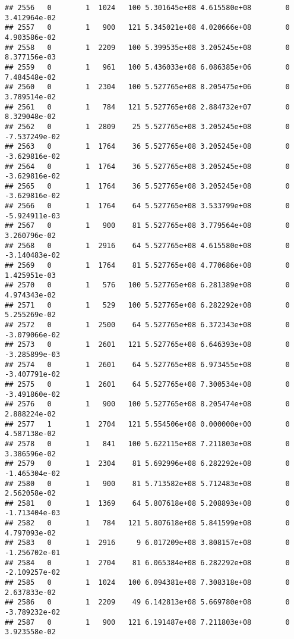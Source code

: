 \documentclass[
]{article}
\begin{document}
\begin{enumerate}
\begin{verbatim}
## 2556   0        1  1024   100 5.301645e+08 4.615580e+08        0  3.412964e-02
## 2557   0        1   900   121 5.345021e+08 4.020666e+08        0  4.903586e-02
## 2558   0        1  2209   100 5.399535e+08 3.205245e+08        0  8.377156e-03
## 2559   0        1   961   100 5.436033e+08 6.086385e+06        0  7.484548e-02
## 2560   0        1  2304   100 5.527765e+08 8.205475e+06        0  3.789514e-02
## 2561   0        1   784   121 5.527765e+08 2.884732e+07        0  8.329048e-02
## 2562   0        1  2809    25 5.527765e+08 3.205245e+08        0 -7.537249e-02
## 2563   0        1  1764    36 5.527765e+08 3.205245e+08        0 -3.629816e-02
## 2564   0        1  1764    36 5.527765e+08 3.205245e+08        0 -3.629816e-02
## 2565   0        1  1764    36 5.527765e+08 3.205245e+08        0 -3.629816e-02
## 2566   0        1  1764    64 5.527765e+08 3.533799e+08        0 -5.924911e-03
## 2567   0        1   900    81 5.527765e+08 3.779564e+08        0  3.260796e-02
## 2568   0        1  2916    64 5.527765e+08 4.615580e+08        0 -3.140483e-02
## 2569   0        1  1764    81 5.527765e+08 4.770686e+08        0  1.425951e-03
## 2570   0        1   576   100 5.527765e+08 6.281389e+08        0  4.974343e-02
## 2571   0        1   529   100 5.527765e+08 6.282292e+08        0  5.255269e-02
## 2572   0        1  2500    64 5.527765e+08 6.372343e+08        0 -3.079066e-02
## 2573   0        1  2601   121 5.527765e+08 6.646393e+08        0 -3.285899e-03
## 2574   0        1  2601    64 5.527765e+08 6.973455e+08        0 -3.407791e-02
## 2575   0        1  2601    64 5.527765e+08 7.300534e+08        0 -3.491860e-02
## 2576   0        1   900   100 5.527765e+08 8.205474e+08        0  2.888224e-02
## 2577   1        1  2704   121 5.554506e+08 0.000000e+00        0  4.587138e-02
## 2578   0        1   841   100 5.622115e+08 7.211803e+08        0  3.386596e-02
## 2579   0        1  2304    81 5.692996e+08 6.282292e+08        0 -1.465304e-02
## 2580   0        1   900    81 5.713582e+08 5.712483e+08        0  2.562058e-02
## 2581   0        1  1369    64 5.807618e+08 5.208893e+08        0 -1.713404e-03
## 2582   0        1   784   121 5.807618e+08 5.841599e+08        0  4.797093e-02
## 2583   0        1  2916     9 6.017209e+08 3.808157e+08        0 -1.256702e-01
## 2584   0        1  2704    81 6.065384e+08 6.282292e+08        0 -2.109257e-02
## 2585   0        1  1024   100 6.094381e+08 7.308318e+08        0  2.637833e-02
## 2586   0        1  2209    49 6.142813e+08 5.669780e+08        0 -3.789232e-02
## 2587   0        1   900   121 6.191487e+08 7.211803e+08        0  3.923558e-02

\end{verbatim}
\end{enumerate}
\end{document}
